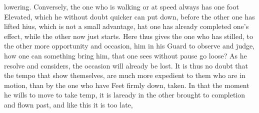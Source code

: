 lowering. Conversely, the one who is walking or at speed always has
one foot Elevated, which he without doubt quicker can put down, before
the other one has lifted hius, which is not a small advantage, hat one
has already completed one's effect, while the other now just starts.
Here thus gives the one who has stilled, to the other more opportunity
and occasion, him in his Guard to observe and judge, how one can
something bring him, that one sees without pause go loose? As he
resolve and considers, the occasion will already be lost. It is thus
no doubt that the tempo that show themselves, are much more expedient
to them who are in motion, than by the one who have Feet firmly down,
taken.  In that the moment he wills to move to take temp, it is
laready in the other brought to completion and flown past, and like
this it is too late,
